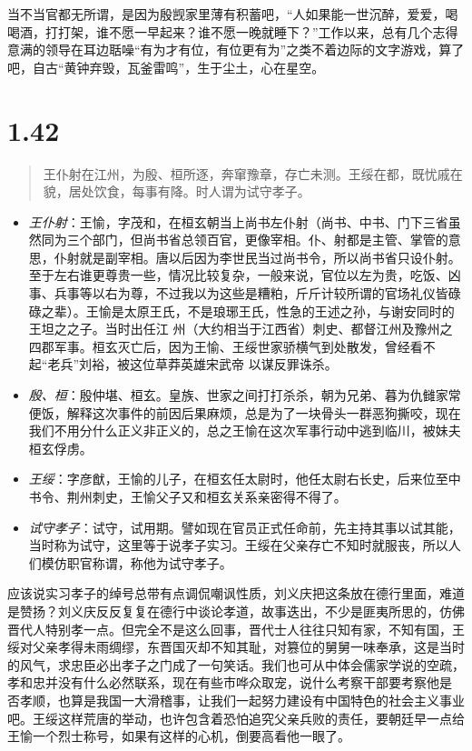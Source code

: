 \documentclass[]{book}
\providecommand{\tightlist}{%
  \setlength{\itemsep}{0pt}\setlength{\parskip}{0pt}}
\begin{document}
当不当官都无所谓，是因为殷觊家里薄有积蓄吧，``人如果能一世沉醉，爱爱，喝喝酒，打打架，谁不愿一早起来？谁不愿一晚就睡下？''工作以来，总有几个志得意满的领导在耳边聒噪``有为才有位，有位更有为''之类不着边际的文字游戏，算了吧，自古``黄钟弃毁，瓦釜雷鸣''，生于尘土，心在星空。

\section{1.42}\label{section-41}

\begin{quote}
王仆射在江州，为殷、桓所逐，奔窜豫章，存亡未测。王绥在都，既忧戚在貌，居处饮食，每事有降。时人谓为试守孝子。
\end{quote}

\begin{itemize}
\tightlist
\item
  \emph{王仆射}：王愉，字茂和，在桓玄朝当上尚书左仆射（尚书、中书、门下三省虽然同为三个部门，但尚书省总领百官，更像宰相。仆、射都是主管、掌管的意思，仆射就是副宰相。唐以后因为李世民当过尚书令，所以尚书省只设仆射。至于左右谁更尊贵一些，情况比较复杂，一般来说，官位以左为贵，吃饭、凶事、兵事等以右为尊，不过我以为这些是糟粕，斤斤计较所谓的官场礼仪皆碌碌之辈）。王愉是太原王氏，不是琅琊王氏，性急的王述之孙，与谢安同时的王坦之之子。当时出任江
  州（大约相当于江西省）刺史、都督江州及豫州之四郡军事。桓玄灭亡后，因为王愉、王绥世家骄横气到处散发，曾经看不起``老兵''刘裕，被这位草莽英雄宋武帝
  以谋反罪诛杀。
\item
  \emph{殷、桓}：殷仲堪、桓玄。皇族、世家之间打打杀杀，朝为兄弟、暮为仇雠家常便饭，解释这次事件的前因后果麻烦，总是为了一块骨头一群恶狗撕咬，现在我们不用分什么正义非正义的，总之王愉在这次军事行动中逃到临川，被妹夫桓玄俘虏。
\item
  \emph{王绥}：字彦猷，王愉的儿子，在桓玄任太尉时，他任太尉右长史，后来位至中书令、荆州刺史，王愉父子又和桓玄关系亲密得不得了。
\item
  \emph{试守孝子}：试守，试用期。譬如现在官员正式任命前，先主持其事以试其能，当时称为试守，这里等于说孝子实习。王绥在父亲存亡不知时就服丧，所以人们模仿职官称谓，称他为试守孝子。
\end{itemize}

应该说实习孝子的绰号总带有点调侃嘲讽性质，刘义庆把这条放在德行里面，难道是赞扬？刘义庆反反复复在德行中谈论孝道，故事迭出，不少是匪夷所思的，仿佛晋代人特别孝一点。但完全不是这么回事，晋代士人往往只知有家，不知有国，王绥对父亲孝得未雨绸缪，东晋国灭却不知其耻，对篡位的舅舅一味奉承，这是当时的风气，求忠臣必出孝子之门成了一句笑话。我们也可从中体会儒家学说的空疏，孝和忠并没有什么必然联系，现在有些市哗众取宠，说什么考察干部要考察他是
否孝顺，也算是我国一大滑稽事，让我们一起努力建设有中国特色的社会主义事业吧。王绥这样荒唐的举动，也许包含着恐怕追究父亲兵败的责任，要朝廷早一点给
王愉一个烈士称号，如果有这样的心机，倒要高看他一眼了。
\end{document}
